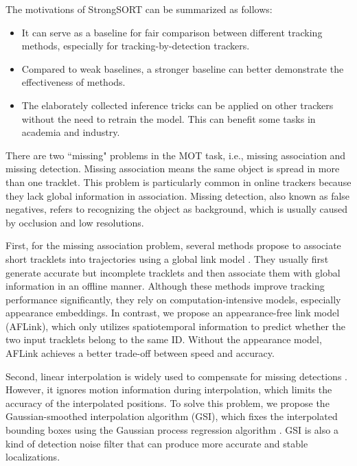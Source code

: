 \documentclass[lettersize,journal]{IEEEtran}
\begin{document}
The motivations of StrongSORT can be summarized as follows:

\begin{itemize}
  \item It can serve as a baseline for fair comparison between different tracking methods, especially for tracking-by-detection trackers.
  \item Compared to weak baselines, a stronger baseline can better demonstrate the effectiveness of methods.
  \item The elaborately collected inference tricks can be applied on other trackers without the need to retrain the model. 
  This can benefit some tasks in academia and industry.
\end{itemize}

There are two ``missing" problems in the MOT task, i.e., missing association and missing detection.
Missing association means the same object is spread in more than one tracklet.
This problem is particularly common in online trackers because they lack global information in association.
Missing detection, also known as false negatives, refers to recognizing the object as background,
which is usually caused by occlusion and low resolutions.

First, for the missing association problem, several methods propose to associate short tracklets into trajectories using a global link model 
\cite{du2021giaotracker, wang2016tracklet, wang2019exploit, peng2020tpm, yang2021remot}.
They usually first generate accurate but incomplete tracklets and then associate them with global information in an offline manner.
Although these methods improve tracking performance significantly, they rely on computation-intensive models, especially appearance embeddings.
In contrast, we propose an appearance-free link model (AFLink),
which only utilizes spatiotemporal information to predict whether the two input tracklets belong to the same ID.
Without the appearance model, AFLink achieves a better trade-off between speed and accuracy. 

Second, linear interpolation is widely used to compensate for missing detections
\cite{perera2006multi,hofmann2013unified,pang2020tubetk,possegger2014occlusion,zhang2022bytetrack,du2021giaotracker}.
However, it ignores motion information during interpolation, which limits the accuracy of the interpolated positions.
To solve this problem, we propose the Gaussian-smoothed interpolation algorithm (GSI), 
which fixes the interpolated bounding boxes using the Gaussian process regression algorithm \cite{williams1995gaussian}.
GSI is also a kind of detection noise filter that can produce more accurate and stable localizations.
\end{document}
